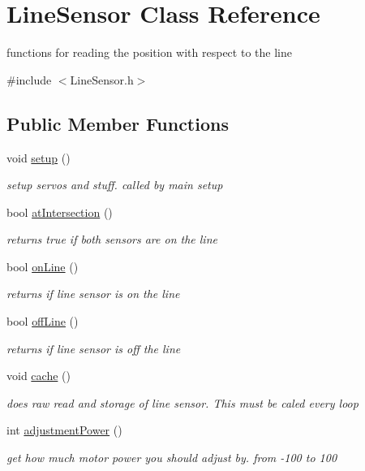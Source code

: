 \hypertarget{classLineSensor}{\section{Line\-Sensor Class Reference}
\label{classLineSensor}
}


functions for reading the position with respect to the line  




{\ttfamily \#include $<$Line\-Sensor.\-h$>$}

\subsection*{Public Member Functions}
\begin{DoxyCompactItemize}
\item 
void \hyperlink{classLineSensor_a555f6f7222ea1e76ed810edbde44c39c}{setup} ()
\begin{DoxyCompactList}\small\item\em setup servos and stuff. called by main setup \end{DoxyCompactList}\item 
bool \hyperlink{classLineSensor_a6769cf781edb7ac4a43086cd62be01e2}{at\-Intersection} ()
\begin{DoxyCompactList}\small\item\em returns true if both sensors are on the line \end{DoxyCompactList}\item 
bool \hyperlink{classLineSensor_ad9d3c5a694f1ff946d1137df1694b026}{on\-Line} ()
\begin{DoxyCompactList}\small\item\em returns if line sensor is on the line \end{DoxyCompactList}\item 
bool \hyperlink{classLineSensor_a0dea8f6d7e7e27d050feecb3e549a149}{off\-Line} ()
\begin{DoxyCompactList}\small\item\em returns if line sensor is off the line \end{DoxyCompactList}\item 
void \hyperlink{classLineSensor_afc809d2aa49426d949f76f68b0154050}{cache} ()
\begin{DoxyCompactList}\small\item\em does raw read and storage of line sensor. This must be caled every loop \end{DoxyCompactList}\item 
int \hyperlink{classLineSensor_a74c3c2d7a454aeacae90501670d01bdc}{adjustment\-Power} ()
\begin{DoxyCompactList}\small\item\em get how much motor power you should adjust by. from -\/100 to 100 \end{DoxyCompactList}\end{DoxyCompactItemize}
